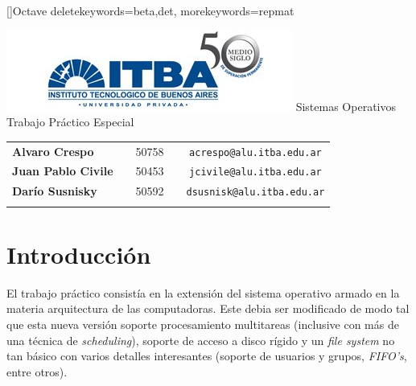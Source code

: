 \documentclass[a4paper,10pt]{article}
\begin{document}
\renewcommand{\lstlistingname}{C\'odigo Fuente}
[]{Octave}{
	deletekeywords={beta,det},
	morekeywords={repmat}
} 
\begin{titlepage}
        \thispagestyle{empty}
        \begin{center}
                \includegraphics{./images/itba.jpg}
                \vfill
                \Huge{Sistemas Operativos}\\
                \vspace{1cm}
                \huge{Trabajo Práctico Especial}\\
        \end{center}
        \vspace{2cm}
        \large{
                \begin{tabular}{lcrc}
                        \textbf{Alvaro Crespo} & & 50758 & \ \ \texttt{acrespo@alu.itba.edu.ar}\\
                        \textbf{Juan Pablo Civile} & & 50453 & \ \ \texttt{jcivile@alu.itba.edu.ar}\\
                        \textbf{Darío Susnisky} & & 50592 & \ \ \texttt{dsusnisk@alu.itba.edu.ar}\\
                        \\ 
                \end{tabular}
        }
        \vfill
\end{titlepage}

\setcounter{page}{1}

\tableofcontents
\newpage
\section{Introducción}
El trabajo práctico consistía en la extensión del sistema operativo armado en la materia arquitectura de las 
computadoras. Este debia ser modificado de modo tal que esta nueva versión soporte procesamiento multitareas
 (inclusive con más de una técnica de \textit{scheduling}), soporte de acceso a disco rígido y un \textit{file system}
 no tan básico con varios detalles interesantes (soporte de usuarios y grupos, \textit{FIFO's}, entre otros).
\end{document}
